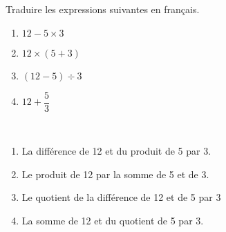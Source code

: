 \begin{exercice}%
    Traduire les expressions suivantes en français.
    \begin{multicols}{2}
      \begin{enumerate}
         \item $12-5\times3$
         \item $12\times(5+3)$
         \item $(12-5)\div3$
         \item $12+\dfrac{5}{3}$
      \end{enumerate}
   \end{multicols}
 \end{exercice}
 
 \begin{corrige}
    \ \\ [-5mm]
    \begin{enumerate}
       \item \blue La différence de 12 et du produit de 5 par 3.
       \item \blue Le produit de 12 par la somme de 5 et de 3.
       \item \blue Le quotient de la différence de 12 et de 5 par 3
       \item \blue La somme de 12 et du quotient de 5 par 3.
    \end{enumerate}
 \end{corrige}
